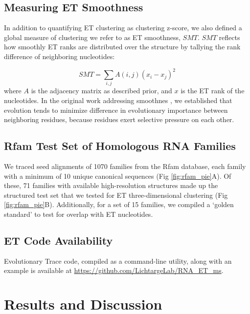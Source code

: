 \documentclass[12pt,a4paper]{report}
\begin{document}
\subsection{Measuring ET Smoothness}
In addition to quantifying ET clustering as clustering z-score, we also defined a global measure of clustering we refer to as ET smoothness, $SMT$. $SMT$ reflects how smoothly ET ranks are distributed over the structure by tallying the rank difference of neighboring nucleotides: 

\begin{equation*} \label{eq:smt_equation}
SMT  = \sum_{i,j} A(i,j)(x_i - x_j)^2
\tag{10}
\end{equation*}
where $A$ is the adjacency matrix as described prior, and $x$ is the ET rank of the nucleotides. In the original work addressing smoothnes \cite{Wilkins2013}, we established that evolution tends to minimize difference in evolutionary importance between neighboring residues, because residues exert selective pressure on each other. 

\subsection{Rfam Test Set of Homologous RNA Families}

We traced seed alignments of 1070 families from the Rfam database, each family with a minimum of 10 unique canonical sequences (Fig \ref{fig:rfam_pie}A). Of these, 71 families with available high-resolution structures made up the structured test set that we tested for ET three-dimensional clustering (Fig \ref{fig:rfam_pie}B). Additionally, for a set of 15 families, we compiled a ‘golden standard’ to test for overlap with ET nucleotides.

\subsection{ET Code Availability}
Evolutionary Trace code, compiled as a command-line utility, along with an example is available at \url{https://github.com/LichtargeLab/RNA_ET_ms}.

\section{Results and Discussion}
\end{document}
